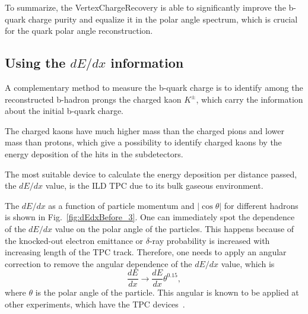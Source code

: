 To summarize, the VertexChargeRecovery is able to significantly improve the b-quark charge purity and equalize it in the polar angle spectrum, which is crucial for the quark polar angle reconstruction. 
\subsection{Using the $dE/dx$ information}

A complementary method to measure the b-quark charge is to identify among the reconstructed b-hadron prongs the charged kaon $K^\pm$, which carry the information about the initial b-quark charge. 

The charged kaons have much higher mass than the charged pions and lower mass than protons, which give a possibility to identify charged kaons by the energy deposition of the hits in the subdetectors. 

The most suitable device to calculate the energy deposition per distance passed, the $dE/dx$ value, is the ILD TPC due to its bulk gaseous environment. 


The $dE/dx$ as a function of particle momentum and $|\cos\theta|$ for different hadrons is shown in Fig.~\ref{fig:dEdxBefore_3}. One can immediately spot the dependence of the $dE/dx$ value on the polar angle of the particles. This happens because of the knocked-out electron emittance or $\delta$-ray probability is increased with increasing length of the TPC track. Therefore, one needs to apply an angular correction to remove the angular dependence of the $dE/dx$ value, which is 
\begin{equation}
	\frac{dE}{dx}\to\frac{dE}{dx}\theta^{0.15},
    \label{formula:dEdxCorrection}
\end{equation}
where $\theta$ is the polar angle of the particle. 
This angular is known to be applied at other experiments, which have the TPC devices~\cite{bib:HARP}.

